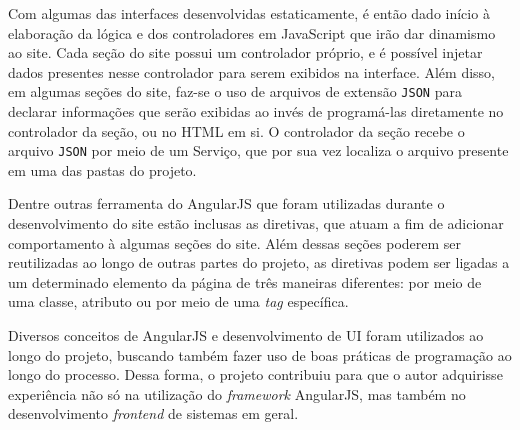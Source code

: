 Com algumas das interfaces desenvolvidas estaticamente, é então dado início à elaboração da lógica e dos controladores em JavaScript que irão dar dinamismo ao site. Cada seção do site possui um controlador próprio, e é possível injetar dados presentes nesse controlador para serem exibidos na interface. Além disso, em algumas seções do site, faz-se o uso de arquivos de extensão \verb|JSON| para declarar informações que serão exibidas ao invés de programá-las diretamente no controlador da seção, ou no HTML em si. O controlador da seção recebe o arquivo \verb|JSON| por meio de um Serviço, que por sua vez localiza o arquivo presente em uma das pastas do projeto.

Dentre outras ferramenta do AngularJS que foram utilizadas durante o desenvolvimento do site estão inclusas as diretivas, que atuam a fim de adicionar comportamento à algumas seções do site. Além dessas seções poderem ser reutilizadas ao longo de outras partes do projeto, as diretivas podem ser ligadas a um determinado elemento da página de três maneiras diferentes: por meio de uma classe, atributo ou por meio de uma \textit{tag} específica.

Diversos conceitos de AngularJS e desenvolvimento de UI foram utilizados ao longo do projeto, buscando também fazer uso de boas práticas de programação ao longo do processo. Dessa forma, o projeto contribuiu para que o autor adquirisse experiência não só na utilização do \textit{framework} AngularJS, mas também no desenvolvimento \textit{frontend} de sistemas em geral.